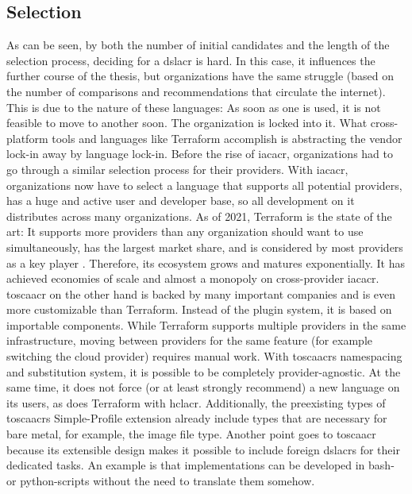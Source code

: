 \subsection{Selection}
As can be seen, by both the number of initial candidates and the length of the selection process, deciding for a \gls{dslacr} is hard. In this case, it  influences the further course of the thesis, but organizations have the same struggle (based on the number of comparisons and recommendations that circulate the internet).
This is due to the nature of these languages: As soon as one is used, it is not feasible to move to another soon. The organization is locked into it. What cross-platform tools and languages like Terraform accomplish is abstracting the vendor lock-in away by language lock-in. Before the rise of \gls{iacacr}, organizations had to go through a similar selection process for their providers. With \gls{iacacr}, organizations now have to select a language that supports all potential providers, has a huge and active user and developer base, so all development on it distributes across many organizations.
\newline
As of 2021, Terraform is the state of the art: It supports more providers than any organization should want to use simultaneously, has the largest market share, and is considered by most providers as a key player \cite{jetbrains_devops_ecosystem_2019}. Therefore, its ecosystem grows and matures exponentially. It has achieved economies of scale and almost a monopoly on cross-provider \gls{iacacr}.
\newline
\Gls{toscaacr} on the other hand is backed by many important companies and is even more customizable than Terraform. Instead of the plugin system, it is based on importable components. While Terraform supports multiple providers in the same infrastructure, moving between providers for the same feature (for example switching the cloud provider) requires manual work. With \gls{toscaacr}s namespacing and substitution system, it is possible to be completely provider-agnostic. At the same time, it does not force (or at least strongly recommend) a new language on its users, as does Terraform with \gls{hclacr}. Additionally, the preexisting types of \gls{toscaacr}s Simple-Profile extension already include types that are necessary for bare metal, for example, the image file type. Another point goes to \gls{toscaacr} because its extensible design makes it possible to include foreign \gls{dslacr}s for their dedicated tasks. An example is that implementations can be developed in bash- or python-scripts without the need to translate them somehow.
